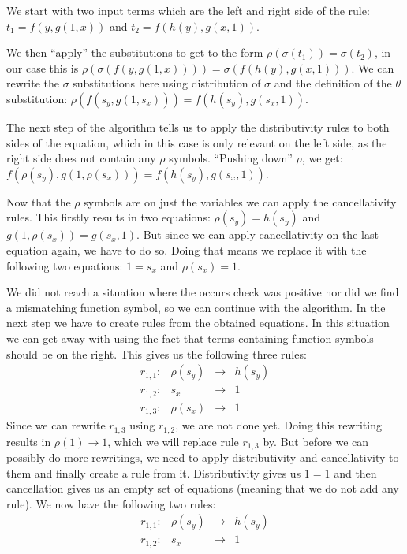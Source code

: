 We start with two input terms which are the left and right side of the rule: $t_1 = f(y, g(1, x))$ and $t_2 = f(h(y), g(x, 1))$.

We then ``apply'' the substitutions to get to the form $\rho(\sigma(t_1)) = \sigma(t_2)$, in our case this is $\rho(\sigma(f(y, g(1, x)))) = \sigma(f(h(y), g(x, 1)))$. We can rewrite the $\sigma$ substitutions here using distribution of $\sigma$ and the definition of the $\theta$ substitution: $\rho(f(s_y, g(1, s_x))) = f(h(s_y), g(s_x, 1))$.

The next step of the algorithm tells us to apply the distributivity rules to both sides of the equation, which in this case is only relevant on the left side, as the right side does not contain any $\rho$ symbols. ``Pushing down'' $\rho$, we get: $f(\rho(s_y), g(1, \rho(s_x))) = f(h(s_y), g(s_x, 1))$.

Now that the $\rho$ symbols are on just the variables we can apply the cancellativity rules. This firstly results in two equations: $\rho(s_y) = h(s_y)$ and $g(1, \rho(s_x)) = g(s_x, 1)$. But since we can apply cancellativity on the last equation again, we have to do so. Doing that means we replace it with the following two equations: $1 = s_x$ and $\rho(s_x) = 1$.

We did not reach a situation where the occurs check was positive nor did we find a mismatching function symbol, so we can continue with the algorithm. In the next step we have to create rules from the obtained equations. In this situation we can get away with using the fact that terms containing function symbols should be on the right. This gives us the following three rules:
$$
\begin{array}{lrcl}
    r_{1,1}: & \rho(s_y) & \rightarrow & h(s_y) \\
    r_{1,2}: & s_x & \rightarrow & 1 \\
    r_{1,3}: & \rho(s_x) & \rightarrow & 1
\end{array}
$$
Since we can rewrite $r_{1,3}$ using $r_{1,2}$, we are not done yet. Doing this rewriting results in $\rho(1) \rightarrow 1$, which we will replace rule $r_{1,3}$ by. But before we can possibly do more rewritings, we need to apply distributivity and cancellativity to them and finally create a rule from it. Distributivity gives us $1 = 1$ and then cancellation gives us an empty set of equations (meaning that we do not add any rule). We now have the following two rules:
$$
\begin{array}{lrcl}
    r_{1,1}: & \rho(s_y) & \rightarrow & h(s_y) \\
    r_{1,2}: & s_x & \rightarrow & 1
\end{array}
$$

